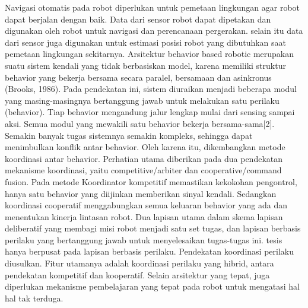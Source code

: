  Navigasi otomatis pada robot diperlukan untuk pemetaan lingkungan agar robot dapat berjalan dengan baik. Data dari sensor robot dapat dipetakan dan digunakan oleh robot untuk navigasi dan perencanaan pergerakan. selain itu data dari sensor juga digunakan untuk estimasi posisi robot yang dibutuhkan saat pemetaan lingkungan sekitarnya. Arsitektur behavior based robotic merupakan suatu sistem kendali yang tidak berbasiskan model, karena memiliki struktur behavior yang bekerja bersama secara paralel, bersamaan dan asinkronus (Brooks, 1986).  Pada pendekatan ini, sistem diuraikan menjadi beberapa modul yang masing-masingnya bertanggung jawab untuk melakukan satu perilaku (behavior). Tiap behavior mengandung jalur lengkap mulai dari sensing sampai aksi. Semua modul yang mewakili satu behavior bekerja bersama-sama[2]. Semakin banyak tugas sistemnya semakin kompleks, sehingga dapat menimbulkan konflik antar behavior. Oleh karena itu, dikembangkan metode koordinasi antar behavior. Perhatian utama diberikan pada dua pendekatan mekanisme koordinasi, yaitu competitive/arbiter dan cooperative/command fusion. Pada metode Koordinator kompetitif memastikan kekokohan pengontrol, hanya satu behavior yang diijinkan memberikan sinyal kendali. Sedangkan koordinasi cooperatif  menggabungkan semua keluaran behavior yang ada dan menentukan kinerja lintasan robot. Dua lapisan utama dalam skema lapisan deliberatif yang membagi misi robot menjadi satu set tugas, dan lapisan berbasis perilaku yang bertanggung jawab untuk menyelesaikan tugas-tugas ini. tesis hanya berpusat pada lapisan berbasis perilaku. Pendekatan koordinasi perilaku diusulkan. Fitur utamanya adalah koordinasi perilaku yang hibrid, antara pendekatan kompetitif dan kooperatif. Selain arsitektur yang tepat, juga diperlukan mekanisme pembelajaran yang tepat pada robot untuk mengatasi hal hal tak terduga.

